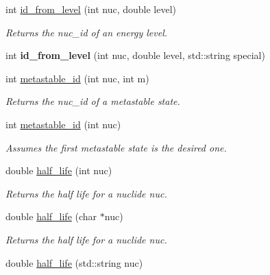 \begin{DoxyCompactItemize}
\item 
int \hyperlink{namespacepyne_a11f4852ba4824c0e047b509efe0c6b8c}{id\+\_\+from\+\_\+level} (int nuc, double level)
\begin{DoxyCompactList}\small\item\em Returns the nuc\+\_\+id of an energy level. \end{DoxyCompactList}\item 
\mbox{\label{namespacepyne_aa3d3232f957170f144e412fa170aaa58}} 
int {\bfseries id\+\_\+from\+\_\+level} (int nuc, double level, std\+::string special)
\item 
int \hyperlink{namespacepyne_a2e817a4d6dac740b6fa883ac99272201}{metastable\+\_\+id} (int nuc, int m)
\begin{DoxyCompactList}\small\item\em Returns the nuc\+\_\+id of a metastable state. \end{DoxyCompactList}\item 
\mbox{\label{namespacepyne_ae4f71f8816cbdd47588d1c3c5fb4908c}} 
int \hyperlink{namespacepyne_ae4f71f8816cbdd47588d1c3c5fb4908c}{metastable\+\_\+id} (int nuc)
\begin{DoxyCompactList}\small\item\em Assumes the first metastable state is the desired one. \end{DoxyCompactList}\item 
double \hyperlink{namespacepyne_a98f776164d1812878cb4b4ee4ef943f5}{half\+\_\+life} (int nuc)
\begin{DoxyCompactList}\small\item\em Returns the half life for a nuclide {\itshape nuc}. \end{DoxyCompactList}\item 
\mbox{\label{namespacepyne_a120acb7c7ff96c26ff012aa192212160}} 
double \hyperlink{namespacepyne_a120acb7c7ff96c26ff012aa192212160}{half\+\_\+life} (char $\ast$nuc)
\begin{DoxyCompactList}\small\item\em Returns the half life for a nuclide {\itshape nuc}. \end{DoxyCompactList}\item 
\mbox{\label{namespacepyne_a8fe3c8e42a1de1edd2547146da3c68b3}} 
double \hyperlink{namespacepyne_a8fe3c8e42a1de1edd2547146da3c68b3}{half\+\_\+life} (std\+::string nuc)

\end{DoxyCompactItemize}
